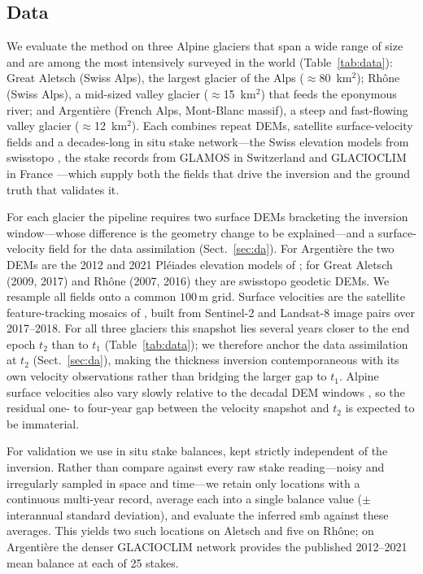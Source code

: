 \subsection{Data}\label{sec:data}

We evaluate the method on three Alpine glaciers that span a wide range of size and
are among the most intensively surveyed in the world (Table~\ref{tab:data}): Great
Aletsch (Swiss Alps), the largest glacier of the Alps ($\approx$80~km$^2$); Rhône
(Swiss Alps), a mid-sized valley glacier ($\approx$15~km$^2$) that feeds the
eponymous river; and Argentière (French Alps, Mont-Blanc massif), a steep
and fast-flowing valley glacier ($\approx$12~km$^2$). Each combines repeat DEMs,
satellite surface-velocity fields and a decades-long in situ stake
network---the Swiss elevation models from swisstopo \citep{swisstopo}, the stake
records from GLAMOS in Switzerland \citep{glamospoint} and GLACIOCLIM in France
\citep{glacioclim}---which supply both the fields that drive the inversion and the ground truth
that validates it.

For each glacier the pipeline requires two surface DEMs bracketing the inversion
window---whose difference is the geometry change to be explained---and a
surface-velocity field for the data assimilation (Sect.~\ref{sec:da}). For Argentière the two DEMs are the 2012 and 2021 Pléiades elevation
models of \citet{kneib2024}; for Great Aletsch (2009, 2017) and Rhône (2007, 2016)
they are swisstopo geodetic DEMs. We resample all fields onto a common
$100\,\mathrm{m}$ grid. Surface velocities are the satellite feature-tracking
mosaics of \citet{millan2022}, built from Sentinel-2 and Landsat-8 image pairs over
2017--2018. For all three glaciers this snapshot lies several years closer to the
end epoch $t_2$ than to $t_1$ (Table~\ref{tab:data}); we therefore anchor the data
assimilation at $t_2$ (Sect.~\ref{sec:da}), making the thickness inversion
contemporaneous with its own velocity observations rather than bridging the larger
gap to $t_1$. Alpine surface velocities also vary slowly relative to the decadal DEM
windows \citep{dehecq2019}, so the residual one- to four-year gap between the
velocity snapshot and $t_2$ is expected to be immaterial.

For validation we use in situ stake balances, kept strictly independent of the
inversion. Rather than compare against every raw stake reading---noisy and
irregularly sampled in space and time---we retain only locations with a continuous
multi-year record, average each into a single balance value ($\pm$ interannual
standard deviation), and evaluate the inferred smb against these averages.
This yields two such locations on Aletsch and five on Rhône; on Argentière the denser GLACIOCLIM
network provides the published 2012--2021 mean balance at each of 25 stakes.

